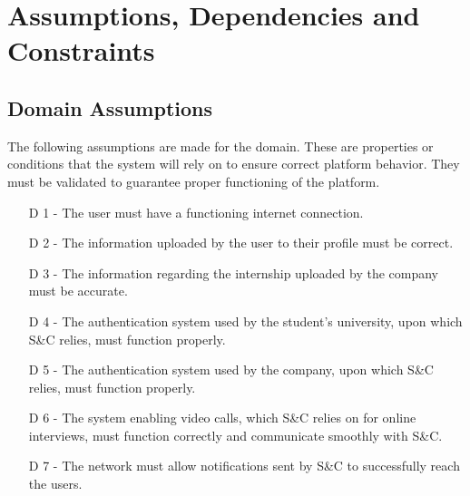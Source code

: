 \newpage
\section{Assumptions, Dependencies and Constraints}
\subsection{Domain Assumptions}

The following assumptions are made for the domain. These are properties or conditions that the
system will rely on to ensure correct platform behavior. They must be validated to guarantee
proper functioning of the platform.

\hspace*{15mm}
\begin{itemize}
    \item [D 1] - The user must have a functioning internet connection.
    \item [D 2] - The information uploaded by the user to their profile must be correct.
    \item [D 3] - The information regarding the internship uploaded by the company must be accurate.
    \item [D 4] - The authentication system used by the student’s university, upon which S\&C relies,
    must function properly.
    \item [D 5] - The authentication system used by the company, upon which S\&C relies, must function
    properly.
    \item [D 6] - The system enabling video calls, which S\&C relies on for online interviews, must
    function correctly and communicate smoothly with S\&C.
    \item [D 7] - The network must allow notifications sent by S\&C to successfully reach the users.
\end{itemize}
\hspace*{15mm}